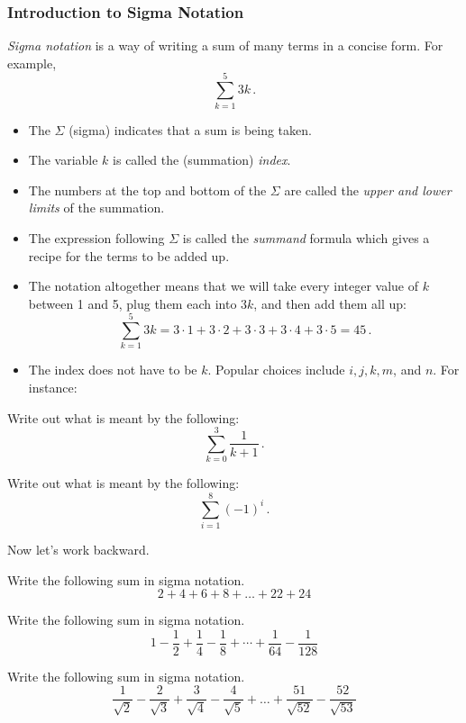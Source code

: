 \documentclass[10pt,t,handout,ignorenonframetext,aspectratio=169]{beamer}
\title[\course]{\lecTitle}
\institute[Ohio State]
{
  \medskip
}
\date[\week]{\semester}
\author{Tae Eun Kim, Ph.D.}
\begin{document}
\begin{frame}
  \titlepage
\end{frame}


\begin{frame}
  \frametitle{Introduction to Sigma Notation}
  \begingroup
  \small
  \textit{Sigma notation} is a way of writing a sum of many terms in a
  concise form. For example,
  \[
    \sum_{k=1}^{5} 3k \,.
  \]
  \begin{itemize}
  \item The $\Sigma$ (sigma) indicates that a sum is being taken.
  \item The variable $k$ is called the (summation) \textit{index}.
  \item The numbers at the top and bottom of the $\Sigma$ are called the
    \textit{upper and lower limits} of the summation.
  \item The expression following $\Sigma$ is called the \textit{summand} formula
    which gives a recipe for the terms to be added up.
  \item The notation altogether means that we will take every integer
    value of $k$ between 1 and 5, plug them each into $3k$, and then
    add them all up:
    \[
      \sum_{k=1}^{5} 3k = 3\cdot 1 + 3\cdot 2 + 3\cdot 3 + 3\cdot 4 + 3\cdot 5 = 45 \,.
    \]
  \item The index does not have to be $k$. Popular choices include
    $i, j, k, m$, and $n$. For instance:
  \end{itemize}
  \endgroup
\end{frame}

\begin{frame}
  \vs
  \begin{question}
    Write out what is meant by the following:
    \[
      \sum_{k=0}^{3} \frac{1}{k+1} \,.
    \]
  \end{question}
  \vfill
  \begin{question}
    Write out what is meant by the following:
    \[
      \sum_{i=1}^{8} \left(-1\right)^i \,.
    \]
  \end{question}
\end{frame}

\begin{frame}
  \vs
  \begingroup
  \small
  Now let's work backward.

  \vs
  \begin{question}
    Write the following sum in sigma notation.
    \[
      2 + 4 + 6 + 8 + \ldots + 22 + 24
    \]
  \end{question}
  \vfill
  \begin{question}
    Write the following sum in sigma notation.
    \[
      1 - \frac{1}{2} + \frac{1}{4} - \frac{1}{8} +
      \cdots + \frac{1}{64} - \frac{1}{128}
    \]
  \end{question}
  \vfill
  \begin{question}
    Write the following sum in sigma notation.
    \[
      \frac{1}{\sqrt{2}} - \frac{2}{\sqrt{3}} + \frac{3}{\sqrt{4}} -
      \frac{4}{\sqrt{5}}+ \ldots + \frac{51}{\sqrt{52}} -
      \frac{52}{\sqrt{53}}
    \]
  \end{question}
  \vfill
  \endgroup
\end{frame}
\end{document}

